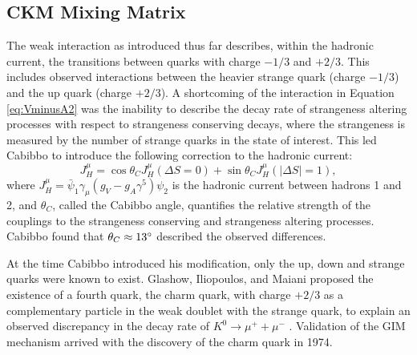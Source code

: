 \subsection{CKM Mixing Matrix}
The weak interaction as introduced thus far describes, within the hadronic current, the transitions
between quarks with charge $-1/3$ and $+2/3$. This includes observed interactions between the heavier
strange quark (charge $-1/3$) and the up quark (charge $+2/3$). 
A shortcoming of the interaction in Equation \ref{eq:VminusA2} was the inability to describe
the decay rate of strangeness altering processes with respect to strangeness conserving
decays, where the strangeness is measured by the number of strange quarks in the state of interest.
This led Cabibbo \cite{cabibbo1963} to introduce the following correction to the hadronic current:
%
\begin{equation}
  J^\mu_H = \cos\theta_C J^\mu_H(\Delta S=0) + \sin\theta_C J^\mu_H(|\Delta S|=1),
  \label{eq:cabibbo}
\end{equation}
%
where $J^\mu_H = \bar{\psi}_1 \gamma_\mu(g_V-g_A\gamma^5)\psi_2$ is the hadronic current between
hadrons 1 and 2, and $\theta_C$, called the Cabibbo angle, quantifies the relative strength
of the couplings to the strangeness conserving and strangeness altering processes.
Cabibbo found that $\theta_C \approx 13\degree$ described the observed differences.

At the time Cabibbo introduced his modification, only the up, down and strange quarks were known
to exist. Glashow, Iliopoulos, and Maiani proposed the existence of a fourth quark, the charm quark,
with charge $+2/3$ as a complementary particle in the weak doublet with the strange quark, to explain
an observed discrepancy in the decay rate of $K^0 \rightarrow \mu^+ + \mu^-$ \cite{glashow1970}.
Validation of the GIM mechanism arrived with the discovery of the
charm quark in 1974.

